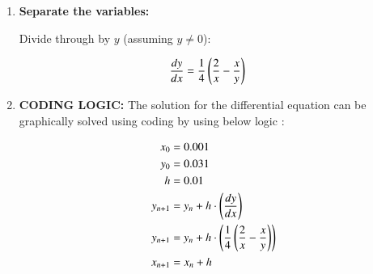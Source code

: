 \documentclass[journal]{IEEEtran}
\numberwithin{equation}{enumi}
\numberwithin{figure}{enumi}
\begin{document}
\begin{enumerate}
\begin{enumerate}
\item \textbf{Separate the variables:}

Divide through by $y$ (assuming \(y \neq 0\)):

\begin{align}
\frac{dy}{dx} &= \frac{1}{4}\left(\frac{2}{x} - \frac{x}{y}\right)
\end{align}



\item \textbf{CODING LOGIC:} The solution for the differential equation can be graphically solved using coding by using below logic :

\begin{align} 
	x_0 &= 0.001 \\ 
	y_0 &= 0.031 \\
	h&=0.01 \\
	y_{n+1} &= y_{n} + h\cdot\left(\frac{dy}{dx}\right) \\ 
	y_{n+1} &= y_{n} + h\cdot\left(\frac{1}{4}\left(\frac{2}{x} - \frac{x}{y}\right)\right) \\ 
	x_{n+1} &= x_{n} + h 
\end{align}


\end{enumerate}
\end{enumerate}
\end{document}
